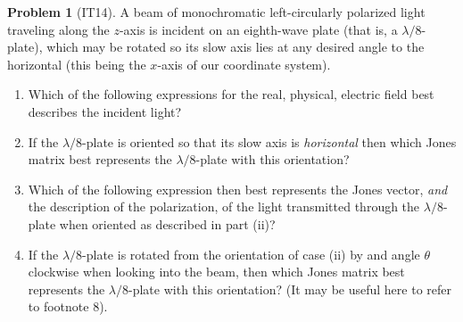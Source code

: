 \documentclass[10pt]{article}
\theoremstyle{definition}
\newtheorem{problem}{Problem}
\begin{document}
\begin{problem}[IT14]
A beam of monochromatic left-circularly polarized light traveling along the $z$-axis is incident on an eighth-wave
plate (that is, a $\lambda/8$-plate), which may be rotated so its slow axis lies at any desired angle to the horizontal
(this being the $x$-axis of our coordinate system).
\begin{enumerate}[label=(\roman*)]
  \item Which of the following expressions for the real, physical, electric field best describes the incident light?
  \item If the $\lambda/8$-plate is oriented so that its slow axis is \emph{horizontal} then which Jones matrix best represents
        the $\lambda/8$-plate with this orientation?
  \item Which of the following expression then best represents the Jones vector, \emph{and} the description of the polarization,
        of the light transmitted through the $\lambda/8$-plate when oriented as described in part (ii)?
  \item If the $\lambda/8$-plate is rotated from the orientation of case (ii) by and angle $\theta$ clockwise when looking into the beam,
        then which Jones matrix best represents the $\lambda/8$-plate with this orientation? (It may be useful here to refer to footnote 8).
\end{enumerate}
\end{problem}
\end{document}

